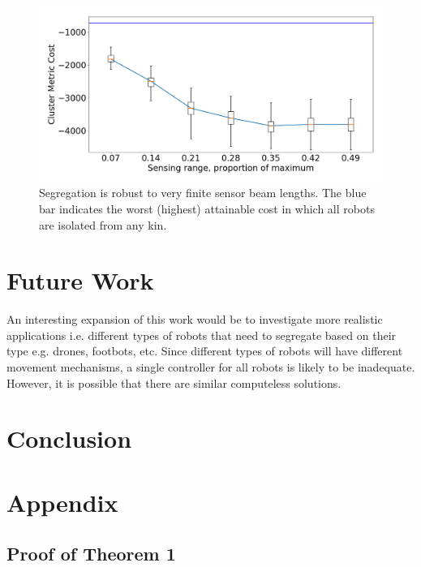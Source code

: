 \documentclass[conference]{IEEEtran}
\begin{document}
    \begin{figure}
      \centering
      \includegraphics[width=1\linewidth]{./images/beam_length.png}
      \caption{Segregation is robust to very finite sensor beam lengths. The blue bar indicates the worst (highest) attainable cost in which all robots are isolated from any kin.}
      \label{fig:beam_length}
    \end{figure}

\section{Future Work}
An interesting expansion of this work would be to investigate more realistic applications i.e. different types of robots that need to segregate based on their type e.g. drones, footbots, etc. Since different types of robots will have different movement mechanisms, a single controller for all robots is likely to be inadequate. However, it is possible that there are similar computeless solutions.


\section{Conclusion}





\onecolumn
\appendix
\section{Appendix}

  \subsection{Proof of Theorem 1} \label{thm:1}
\end{document}
